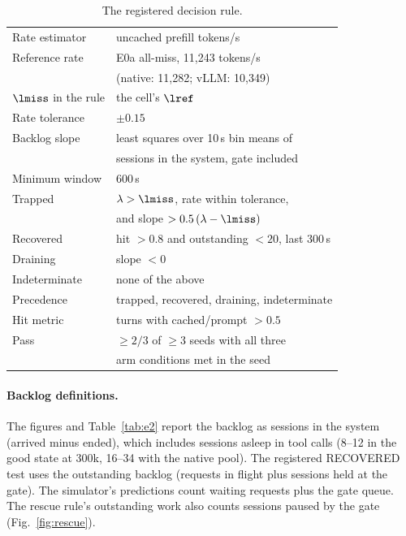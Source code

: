 \begin{table}[htbp]
\centering\footnotesize
\caption{The registered decision rule.}\label{tab:rule}
\begin{tabular}{@{}l l@{}}
\toprule
Rate estimator & uncached prefill tokens/s\\
Reference rate & E0a all-miss, 11,243 tokens/s\\
 & \quad (native: 11,282; vLLM: 10,349)\\
$\lmiss$ in the rule & the cell's $\lref$\\
Rate tolerance & $\pm0.15$\\
Backlog slope & least squares over 10\,s bin means of\\
 & \quad sessions in the system, gate included\\
Minimum window & 600\,s\\
Trapped & $\lambda>\lmiss$, rate within tolerance,\\
 & \quad and slope $>0.5\,(\lambda-\lmiss)$\\
Recovered & hit $>0.8$ and outstanding $<20$, last 300\,s\\
Draining & slope $<0$\\
Indeterminate & none of the above\\
Precedence & trapped, recovered, draining, indeterminate\\
Hit metric & turns with cached/prompt $>0.5$\\
Pass & $\ge2/3$ of $\ge3$ seeds with all three\\
 & \quad arm conditions met in the seed\\
\bottomrule
\end{tabular}
\end{table}

\paragraph{Backlog definitions.} The figures and Table~\ref{tab:e2} report the backlog as sessions in the system (arrived minus ended), which includes sessions asleep in tool calls (8--12 in the good state at 300k, 16--34 with the native pool). The registered RECOVERED test uses the outstanding backlog (requests in flight plus sessions held at the gate). The simulator's predictions count waiting requests plus the gate queue. The rescue rule's outstanding work also counts sessions paused by the gate (Fig.~\ref{fig:rescue}).

